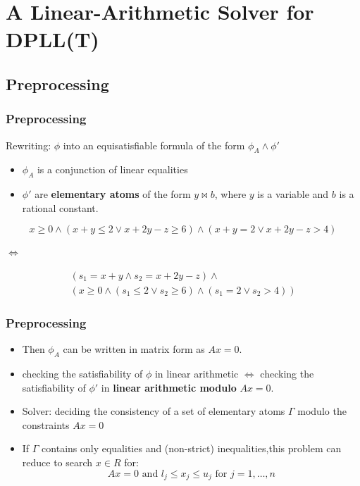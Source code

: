 \documentclass[aspectratio=169%
,serif,mathserif]{beamer}
\begin{document}
\section{A Linear-Arithmetic Solver for DPLL(T)}
\subsection{Preprocessing}
\begin{frame}
	\frametitle{Preprocessing}
	Rewriting: $\phi$ into an equisatisfiable formula of the form $\phi_A \wedge \phi'$
	\begin{itemize}
		\item $\phi_A$ is a conjunction of linear equalities
		\item $\phi'$ are \textbf{elementary atoms} of the form $y \bowtie b$, where $y$ is a variable and $b$ is a rational constant. 
	\end{itemize}

	$$
		x \geq 0 \wedge(x+y \leq 2 \vee x+2 y-z \geq 6) \wedge(x+y=2 \vee x+2 y-z>4) 
	$$

	$\iff$

	$$
	\begin{gathered}
		\left(s_{1}=x+y \wedge s_{2}=x+2 y-z\right) \wedge \\
		\left(x \geq 0 \wedge\left(s_{1} \leq 2 \vee s_{2} \geq 6\right) \wedge\left(s_{1}=2 \vee s_{2}>4\right)\right)
	\end{gathered}
	$$

\end{frame}

\begin{frame}
	\frametitle{Preprocessing}
	\begin{itemize}
		\item Then $\phi_A$ can be written in matrix form as $Ax = 0$.
		\item checking the satisfiability of $\phi$ in linear arithmetic $\iff$ checking the satisfiability of $\phi'$ in \textbf{linear arithmetic modulo} $Ax = 0$.
		\item Solver: deciding the consistency of a set of elementary atoms $\Gamma$ modulo the constraints $Ax = 0$
		\item If $\Gamma$ contains only equalities and (non-strict) inequalities,this problem can reduce to search $x \in R$ for:
			\begin{equation}
				A x=0 \text { and } l_{j} \leq x_{j} \leq u_{j} \text { for } j=1, \ldots, n
			\end{equation}
	\end{itemize}
\end{frame}
\end{document}
